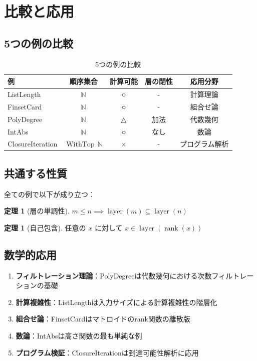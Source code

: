 \documentclass[a4paper,11pt]{ltjsarticle}
\theoremstyle{definition}
\newtheorem{theorem}[definition]{定理}
\newcommand{\rank}{\operatorname{rank}}
\newcommand{\layer}{\operatorname{layer}}
\newcommand{\WithTop}{\operatorname{WithTop}}
\begin{document}
\section{比較と応用}

\subsection{5つの例の比較}

\begin{table}[h]
\centering
\small
\begin{tabular}{|l|c|c|c|c|}
\hline
例 & 順序集合 & 計算可能 & 層の閉性 & 応用分野 \\
\hline
ListLength & $\mathbb{N}$ & ○ & - & 計算理論 \\
FinsetCard & $\mathbb{N}$ & ○ & - & 組合せ論 \\
PolyDegree & $\mathbb{N}$ & △ & 加法 & 代数幾何 \\
IntAbs & $\mathbb{N}$ & ○ & なし & 数論 \\
ClosureIteration & $\WithTop\,\mathbb{N}$ & × & - & プログラム解析 \\
\hline
\end{tabular}
\caption{5つの例の比較}
\label{tab:comparison}
\end{table}

\subsection{共通する性質}

全ての例で以下が成り立つ：

\begin{theorem}[層の単調性]
$m \leq n \implies \layer(m) \subseteq \layer(n)$
\end{theorem}

\begin{theorem}[自己包含]
任意の $x$ に対して $x \in \layer(\rank(x))$
\end{theorem}

\subsection{数学的応用}

\begin{enumerate}
\item \textbf{フィルトレーション理論}：PolyDegreeは代数幾何における次数フィルトレーションの基礎
\item \textbf{計算複雑性}：ListLengthは入力サイズによる計算複雑性の階層化
\item \textbf{組合せ論}：FinsetCardはマトロイドのrank関数の離散版
\item \textbf{数論}：IntAbsは高さ関数の最も単純な例
\item \textbf{プログラム検証}：ClosureIterationは到達可能性解析に応用
\end{enumerate}
\end{document}
